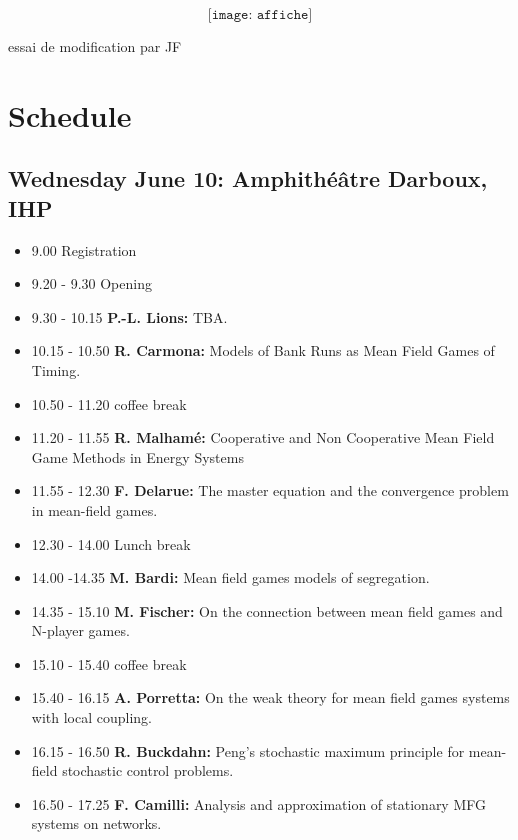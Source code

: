 \documentclass[11pt]{article}
\begin{document}
\[
\texttt{[image: affiche]}
\]
\vfill\eject

essai de modification par JF

\section*{Schedule}

\subsection*{Wednesday June  10: Amphith{\'e}{\^a}tre Darboux, IHP}
\begin{itemize}
\item 9.00  Registration 
\item 9.20 - 9.30  Opening
\item 9.30 - 10.15  {\bf P.-L. Lions:}  TBA.
\item 10.15 - 10.50  {\bf R. Carmona:}  Models of Bank Runs as Mean Field Games of Timing. 
\item 10.50 - 11.20   coffee break
\item 11.20 - 11.55  {\bf R. Malham{\' e}:}   Cooperative and Non Cooperative Mean Field Game Methods in Energy Systems 
\item 11.55 - 12.30  {\bf F. Delarue:}  The master equation and the convergence problem in mean-field games.
\item 12.30 - 14.00  Lunch break
\item 14.00 -14.35 {\bf  M. Bardi:} Mean field games models of segregation.
\item 14.35 - 15.10 {\bf M. Fischer:} On the connection between mean field games and N-player games. 
\item 15.10 - 15.40  coffee break
\item 15.40 - 16.15  {\bf  A. Porretta:} On the weak theory for mean field games systems with local coupling. 
\item 16.15 - 16.50 {\bf  R. Buckdahn:} Peng's stochastic maximum principle for mean-field stochastic control problems. 
\item 16.50 - 17.25 {\bf  F. Camilli:} Analysis and approximation of   stationary MFG systems  on  networks.
\end{itemize}
\vfill\eject
\end{document}
